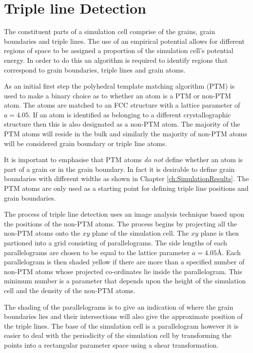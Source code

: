 \documentclass[12pt,a4paper,openany]{report}
\begin{document}
\section{Triple line Detection}

The constituent parts of a simulation cell comprise of the grains, grain boundaries and triple lines. The use of an empirical potential allows for different regions of space to be assigned a proportion of the simulation cell's potential energy. In order to do this an algorithm is required to identify regions that correspond to grain boundaries, triple lines and grain atoms.

As an initial first step the polyhedral template matching algorithm (PTM) is used to make a binary choice as to whether an atom is a PTM or non-PTM atom. The atoms are matched to an FCC structure with a lattice parameter of $a=4.05$. If an atom is identified as belonging to a different crystallographic structure then this is also designated as a non-PTM atom. The majority of the PTM atoms will reside in the bulk and similarly the majority of non-PTM atoms will be considered grain boundary or triple line atoms. 

It is important to emphasise that PTM atoms \emph{do not} define whether an atom is part of a grain or in the grain boundary. In fact it is desirable to define grain boundaries with different widths as shown in Chapter \ref{ch:SimulationResults}. The PTM atoms are only used as a starting point for defining triple line positions and grain boundaries.

The process of triple line detection uses an image analysis technique based upon the positions of the non-PTM atoms. The process begins by projecting all the non-PTM atoms onto the $xy$ plane of the simulation cell. The $xy$ plane is then partioned into a grid consisting of parallelograms. The side lengths of each parallelograms are chosen to be equal to the lattice parameter $a =4.05 \textrm{\AA}$. Each parallelogram is then shaded yellow if there are more than a specified number of non-PTM atoms whose projected co-ordinates lie inside the parallelogram. This minimum number is a parameter that depends upon the height of the simulation cell and the density of the non-PTM atoms. 

The shading of the parallelograms is to give an indication of where the grain boundaries lies and their intersections will also give the approximate position of the triple lines. The base of the simulation cell is a parallelogram however it is easier to deal with the periodicity of the simulation cell by transforming the points into a rectangular parameter space using a shear transformation. 
\end{document}
